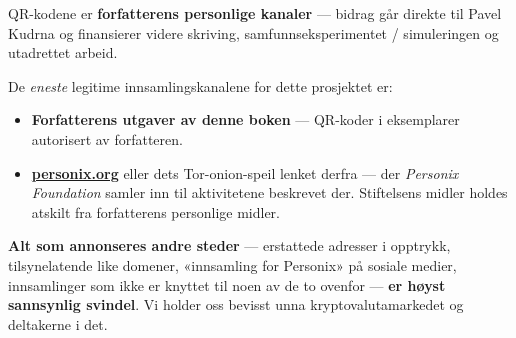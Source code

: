 \begin{minipage}[t]{0.60\textwidth}
\vspace{0pt}
\begin{mdframed}[
  linewidth=0.7pt,roundcorner=5pt,
  innerleftmargin=10pt,innerrightmargin=10pt,
  innertopmargin=8pt,innerbottommargin=8pt,
  skipabove=0pt,skipbelow=0pt,
  linecolor=cbwarning!50,backgroundcolor=cbwarning!5,
  nobreak=true,
  needspace=4\baselineskip,
]
\footnotesize
QR-kodene er \textbf{forfatterens personlige kanaler} --- bidrag går direkte til Pavel Kudrna og finansierer videre skriving, samfunnseksperimentet / simuleringen og utadrettet arbeid.

\smallskip
De \emph{eneste} legitime innsamlingskanalene for dette prosjektet er:

\smallskip
\begin{itemize}
\setlength{\itemsep}{0pt}
\setlength{\topsep}{0pt}
\item \textbf{Forfatterens utgaver av denne boken} --- QR-koder i eksemplarer autorisert av forfatteren.
\item \href{https://personix.org}{\textbf{personix.org}} eller dets Tor-onion-speil lenket derfra --- der \emph{Personix Foundation} samler inn til aktivitetene beskrevet der. Stiftelsens midler holdes atskilt fra forfatterens personlige midler.
\end{itemize}

\smallskip
\textbf{Alt som annonseres andre steder} --- erstattede adresser i opptrykk, tilsynelatende like domener, «innsamling for Personix» på sosiale medier, innsamlinger som ikke er knyttet til noen av de to ovenfor --- \textbf{er høyst sannsynlig svindel}. Vi holder oss bevisst unna kryptovalutamarkedet og deltakerne i det.
\end{mdframed}
\end{minipage}

\clearpage
